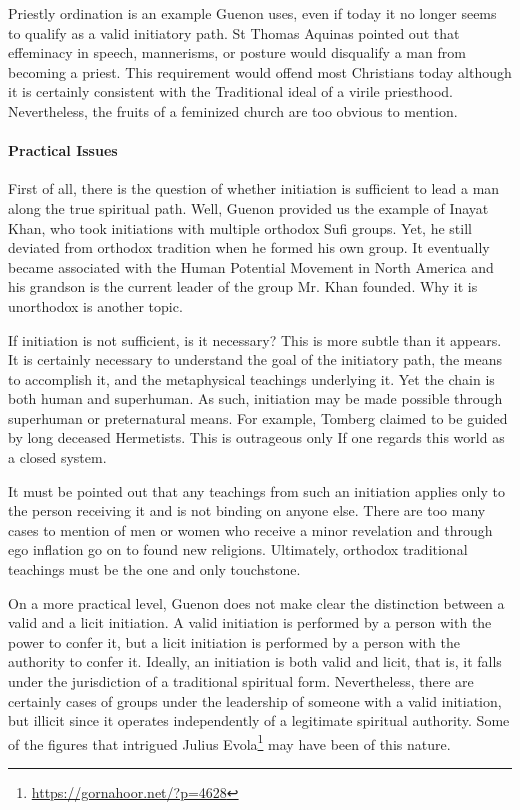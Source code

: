 Priestly ordination is an example Guenon uses, even if today it no longer seems to qualify as a valid initiatory path. St Thomas Aquinas pointed out that effeminacy in speech, mannerisms, or posture would disqualify a man from becoming a priest. This requirement would offend most Christians today although it is certainly consistent with the Traditional ideal of a virile priesthood. Nevertheless, the fruits of a feminized church are too obvious to mention.

\paragraph{Practical Issues}


First of all, there is the question of whether initiation is sufficient to lead a man along the true spiritual path. Well, Guenon provided us the example of Inayat Khan, who took initiations with multiple orthodox Sufi groups. Yet, he still deviated from orthodox tradition when he formed his own group. It eventually became associated with the Human Potential Movement in North America and his grandson is the current leader of the group Mr. Khan founded. Why it is unorthodox is another topic.

If initiation is not sufficient, is it necessary? This is more subtle than it appears. It is certainly necessary to understand the goal of the initiatory path, the means to accomplish it, and the metaphysical teachings underlying it. Yet the chain is both human and superhuman. As such, initiation may be made possible through superhuman or preternatural means. For example, Tomberg claimed to be guided by long deceased Hermetists. This is outrageous only If one regards this world as a closed system.

It must be pointed out that any teachings from such an initiation applies only to the person receiving it and is not binding on anyone else. There are too many cases to mention of men or women who receive a minor revelation and through ego inflation go on to found new religions. Ultimately, orthodox traditional teachings must be the one and only touchstone.

On a more practical level, Guenon does not make clear the distinction between a valid and a licit initiation. A valid initiation is performed by a person with the power to confer it, but a licit initiation is performed by a person with the authority to confer it. Ideally, an initiation is both valid and licit, that is, it falls under the jurisdiction of a traditional spiritual form. Nevertheless, there are certainly cases of groups under the leadership of someone with a valid initiation, but illicit since it operates independently of a legitimate spiritual authority. Some of the figures that intrigued Julius Evola\footnote{\url{https://gornahoor.net/?p=4628}} may have been of this nature.

